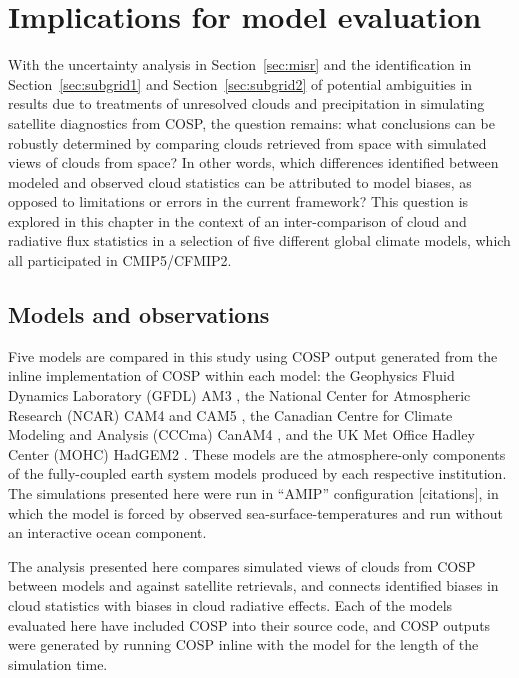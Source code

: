 \chapter{Implications for model evaluation}\label{sec:cmip5}

With the uncertainty analysis in Section~\ref{sec:misr} and the
identification in Section~\ref{sec:subgrid1} and
Section~\ref{sec:subgrid2} of potential ambiguities in results due to
treatments of unresolved clouds and precipitation in simulating
satellite diagnostics from COSP, the question remains: what conclusions
can be robustly determined by comparing clouds retrieved from space with
simulated views of clouds from space? In other words, which differences
identified between modeled and observed cloud statistics can be
attributed to model biases, as opposed to limitations or errors in the
current framework? This question is explored in this chapter in the
context of an inter-comparison of cloud and radiative flux statistics in
a selection of five different global climate models, which all
participated in CMIP5/CFMIP2.

\section{Models and observations}\label{models-and-observations}

Five models are compared in this study using COSP output generated from
the inline implementation of COSP within each model: the Geophysics
Fluid Dynamics Laboratory (GFDL) AM3 \citep{donner_et_al_2011}, the
National Center for Atmospheric Research (NCAR) CAM4
\citep{neale_et_al_2010a} and CAM5 \citep{neale_et_al_2010b}, the
Canadian Centre for Climate Modeling and Analysis (CCCma) CanAM4
\citep{von_salzen_et_al_2012}, and the UK Met Office Hadley Center
(MOHC) HadGEM2 \citep{martin_et_al_2011}. These models are the
atmosphere-only components of the fully-coupled earth system models
produced by each respective institution. The simulations presented here
were run in ``AMIP'' configuration {[}citations{]}, in which the model
is forced by observed sea-surface-temperatures and run without an
interactive ocean component.

The analysis presented here compares simulated views of clouds from COSP
between models and against satellite retrievals, and connects identified
biases in cloud statistics with biases in cloud radiative effects. Each
of the models evaluated here have included COSP into their source code,
and COSP outputs were generated by running COSP inline with the model
for the length of the simulation time.

